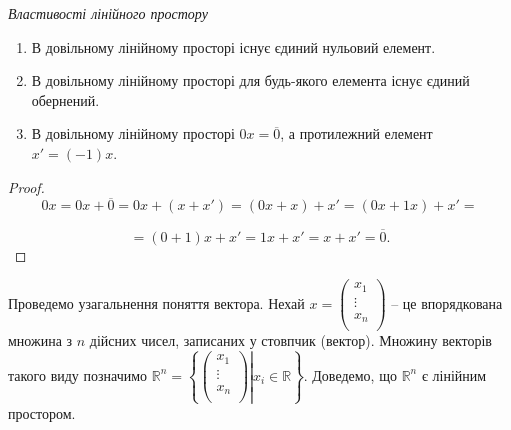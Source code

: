 \textit{Властивості лінійного простору}
\begin{enumerate}
	\item В довільному лінійному просторі існує єдиний нульовий елемент.
	\item В довільному лінійному просторі для будь-якого елемента існує єдиний обернений.
	\item В довільному лінійному просторі $0 x = \overline{0}$, а протилежний елемент $x' = (-1)x$.
\end{enumerate}
\begin{proof}
	$$0x = 0 x + \overline{0} = 0 x + (x+x') = (0x + x) + x' = (0x + 1x) + x' = $$
	
	$$= (0 + 1)x + x' = 1x + x' = x + x' = \overline{0}.$$
\end{proof}

\begin{example}
	Проведемо узагальнення поняття вектора. Нехай $x = \begin{pmatrix}
		x_1  \\
		\vdots  \\
		x_n  \\
	\end{pmatrix}$ -- це
	впорядкована множина з $n$ дійсних чисел, записаних у стовпчик (вектор).
	Множину векторів такого виду позначимо $\mathbb{R}^n = \left\{\left.\begin{pmatrix}
		x_1  \\
		\vdots  \\
		x_n  \\
	\end{pmatrix}\right| x_i \in \mathbb{R}\right\}$. Доведемо, що $\mathbb{R}^n$
	є лінійним простором.
\end{example}
